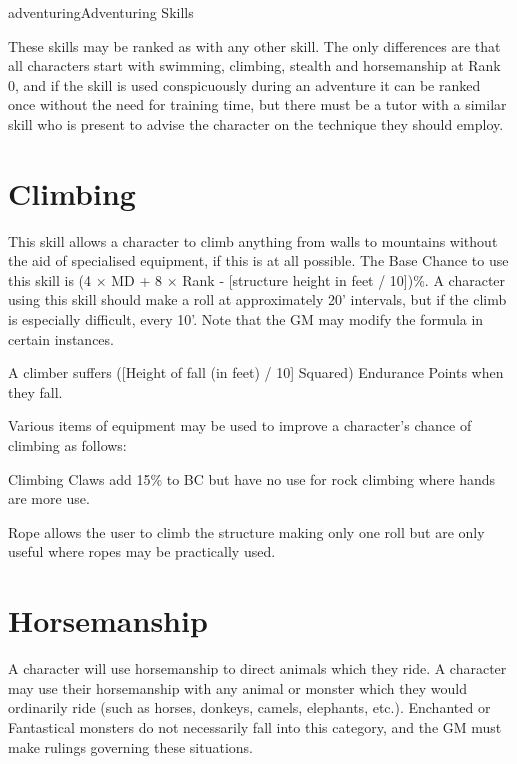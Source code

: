 \begin{Skill}[1.2]{adventuring}{Adventuring Skills}

These skills may be ranked as with any other skill.  The only
differences are that all characters start with swimming, climbing,
stealth and horsemanship at Rank 0, and if the skill is used
conspicuously during an adventure it can be ranked once without the
need for training time, but there must be a tutor with a similar skill
who is present to advise the character on the technique they should
employ.

\section{Climbing}

This skill allows a character to climb anything from walls to
mountains without the aid of specialised equipment, if this is at all
possible.  The Base Chance to use this skill is (4 × MD + 8 × Rank -
[structure height in feet / 10])\%.  A character using this skill
should make a roll at approximately 20’ intervals, but if the climb is
especially difficult, every 10’.  Note that the GM may modify the
formula in certain instances.

A climber suffers ([Height of fall (in feet) / 10] Squared) Endurance
Points when they fall.

Various items of equipment may be used to improve a character’s chance
of climbing as follows:
\begin{Itemize}
  
\item Climbing Claws add 15\% to BC but have no use for rock climbing
  where hands are more use.

\item Rope allows the user to climb the structure making only one roll
  but are only useful where ropes may be practically used.

\end{Itemize}

\section{Horsemanship}

A character will use horsemanship to direct animals which they ride.
A character may use their horsemanship with any animal or monster
which they would ordinarily ride (such as horses, donkeys, camels,
elephants, etc.). Enchanted or Fantastical monsters do not necessarily
fall into this category, and the GM must make rulings governing these
situations.


\end{Skill}

